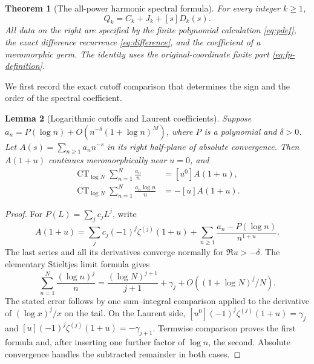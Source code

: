 \documentclass[11pt,a4paper]{article}
\numberwithin{equation}{section}
\newtheorem{theorem}{Theorem}[section]
\newtheorem{lemma}[theorem]{Lemma}
\theoremstyle{definition}
\theoremstyle{remark}
\DeclareMathOperator{\CT}{CT}
\begin{document}
\begin{theorem}[The all-power harmonic spectral formula]
\label{thm:all-power}
For every integer $k\ge1$,
\begin{equation}
                 \boxed{\;Q_k=C_k+J_k+[s]D_k(s).\;}
 \label{eq:all-power}
\end{equation}
All data on the right are specified by the finite polynomial
calculation \eqref{eq:pdef}, the exact difference recurrence
\eqref{eq:difference}, and the coefficient of a meromorphic germ.
The identity uses the original-coordinate finite part
\eqref{eq:fp-definition}.
\end{theorem}

We first record the exact cutoff comparison that determines the sign
and the order of the spectral coefficient.

\begin{lemma}[Logarithmic cutoffs and Laurent coefficients]
\label{lem:cutoff}
Suppose
$a_n=P(\log n)+O(n^{-\delta}(1+\log n)^M)$, where $P$ is a
polynomial and $\delta>0$.  Let $A(s)=\sum_{n\ge1}a_nn^{-s}$
in its right half-plane of absolute convergence.  Then $A(1+u)$
continues meromorphically near $u=0$, and
\begin{align}
 \CT_{\log N}\sum_{n=1}^N\frac{a_n}{n}
           &=[u^0]A(1+u), \label{eq:cutoff-zero}\\
 \CT_{\log N}\sum_{n=1}^N\frac{a_n\log n}{n}
           &=-[u]A(1+u). \label{eq:cutoff-one}
\end{align}
\end{lemma}

\begin{proof}
For $P(L)=\sum_j c_jL^j$, write
\[
 A(1+u)=\sum_j c_j(-1)^j\zeta^{(j)}(1+u)
           +\sum_{n\ge1}\frac{a_n-P(\log n)}{n^{1+u}}.
\]
The last series and all its derivatives converge normally for
$\Re u>-\delta$.  The elementary Stieltjes limit formula gives
\[
 \sum_{n=1}^N\frac{(\log n)^j}{n}
       =\frac{(\log N)^{j+1}}{j+1}+\gamma_j
                    +O((1+\log N)^j/N).
\]
The stated error follows by one sum--integral comparison applied
to the derivative of $(\log x)^j/x$ on the tail.
On the Laurent side,
$[u^0](-1)^j\zeta^{(j)}(1+u)=\gamma_j$ and
$[u](-1)^j\zeta^{(j)}(1+u)=-\gamma_{j+1}$.
Termwise comparison proves the first formula and, after inserting
one further factor of $\log n$, the second.  Absolute convergence
handles the subtracted remainder in both cases.
\end{proof}
\end{document}
